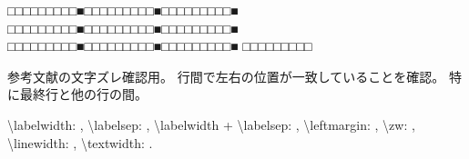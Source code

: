 \documentclass{FITpaper}
\begin{document}
\begin{thebibliography}{9}

  □□□□□□□□□■□□□□□□□□□■□□□□□□□□□■
  □□□□□□□□□■□□□□□□□□□■□□□□□□□□□■
  □□□□□□□□□■□□□□□□□□□■□□□□□□□□□■
  □□□□□□□□□

  参考文献の文字ズレ確認用。
  行間で左右の位置が一致していることを確認。
  特に最終行と他の行の間。

  \textbackslash labelwidth: \the{},
  \textbackslash labelsep: \the{},
  \textbackslash labelwidth + \textbackslash labelsep:
  \newlength{\temptotal}\setlength{\temptotal}{\labelwidth}
  \addtolength{\temptotal}{\labelsep}\the\temptotal,
  \textbackslash leftmargin: \the\leftmargin,
  \textbackslash zw: \the\myzw,
  \textbackslash linewidth: \the\linewidth,
  \textbackslash textwidth: \the\textwidth.

\end{thebibliography}
\end{document}
